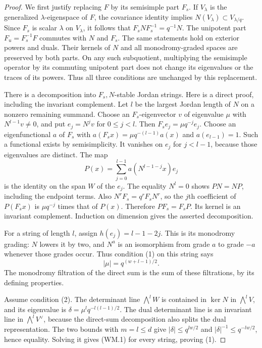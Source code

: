 \begin{proof}
We first justify replacing $F$ by its semisimple part $F_s$.
If $V_\lambda$ is the generalized $\lambda$-eigenspace of $F$,
the covariance identity implies
$N(V_\lambda)\subset V_{\lambda/q}$.
Since $F_s$ is scalar $\lambda$ on $V_\lambda$, it follows
that $F_sNF_s^{-1}=q^{-1}N$. The unipotent part
$F_u=F_s^{-1}F$ commutes with $N$ and $F_s$.
The same statements hold on exterior powers and duals.
Their kernels of $N$ and all monodromy-graded spaces are
preserved by both parts. On any such subquotient, multiplying
the semisimple operator by its commuting unipotent part
does not change its eigenvalues or the traces of its powers.
Thus all three conditions are unchanged by this replacement.

There is a decomposition into $F_s,N$-stable Jordan strings.
Here is a direct proof, including the invariant complement.
Let $l$ be the largest Jordan length of $N$ on a nonzero
remaining summand. Choose an $F_s$-eigenvector $v$ of
eigenvalue $\mu$ with $N^{l-1}v\ne0$, and put
$e_j=N^jv$ for $0\leq j<l$.
Then $F_se_j=\mu q^{-j}e_j$. Choose an eigenfunctional
$a$ of $F_s$ with
$a(F_sx)=\mu q^{-(l-1)}a(x)$ and $a(e_{l-1})=1$.
Such a functional exists by semisimplicity. It vanishes
on $e_j$ for $j<l-1$, because those eigenvalues are distinct.
The map
\[
 P(x)=\sum_{j=0}^{l-1}a(N^{l-1-j}x)e_j
\]
is the identity on the span $W$ of the $e_j$.
The equality $N^l=0$ shows $PN=NP$, including the endpoint
terms. Also $N^rF_s=q^rF_sN^r$, so the $j$th coefficient
of $P(F_sx)$ is $\mu q^{-j}$ times that of $P(x)$.
Therefore $PF_s=F_sP$. Its kernel is an invariant
complement. Induction on dimension gives the asserted
decomposition.

For a string of length $l$, assign
$h(e_j)=l-1-2j$. This is its monodromy grading:
$N$ lowers it by two, and $N^a$ is an isomorphism from
grade $a$ to grade $-a$ whenever those grades occur.
Thus condition (1) on this string says
\[
       |\mu|=q^{(w+l-1)/2}.                         \tag{WM.1}
\]
The monodromy filtration of the direct sum is the sum
of these filtrations, by its defining properties.

Assume condition (2). The determinant line
$\bigwedge^lW$ is contained in $\ker N$ in
$\bigwedge^lV$, and its eigenvalue is
$\delta=\mu^l q^{-l(l-1)/2}$.
The dual determinant line is an invariant line in
$\bigwedge^lV^\vee$, because the direct-sum decomposition
also splits the dual representation. The two bounds with
$m=l\leq d$ give
$|\delta|\leq q^{lw/2}$ and
$|\delta|^{-1}\leq q^{-lw/2}$, hence equality.
Solving it gives (WM.1) for every string, proving (1).


\end{proof}
